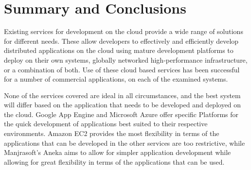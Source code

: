 \chapter{Summary and Conclusions}
Existing services for development on the cloud provide a wide range of solutions for different needs. These allow developers to effectively and efficiently develop distributed applications on the cloud using mature development platforms to deploy on their own systems, globally networked high-performance infrastructure, or a combination of both. Use of these cloud based services has been successful for a number of commercial applications, on each of the examined systems. 

None of the services covered are ideal in all circumstances, and the best system will differ based on the application that needs to be developed and deployed on the cloud. Google App Engine and Microsoft Azure offer specific Platforms for the quick development of applications best suited to their respective environments. Amazon EC2 provides the most flexibility in terms of the applications that can be developed in the other services are too restrictive, while Manjrasoft's Aneka aims to allow for simpler application development while allowing for great flexibility in terms of the applications that can be used.
